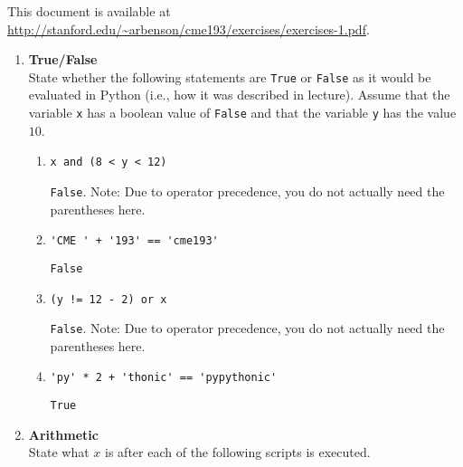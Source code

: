 \documentclass{article}
\begin{document}
\pagestyle{fancy}

This document is available at \url{http://stanford.edu/~arbenson/cme193/exercises/exercises-1.pdf}.


\begin{enumerate}
\item \textbf{True/False} \\
State whether the following statements are \texttt{True} or \texttt{False} as it would be evaluated in Python (i.e., how it was described in lecture).  Assume that the variable \texttt{x} has a boolean value of \texttt{False} and that the variable \texttt{y} has the value $10$.

\begin{enumerate}
\item
\begin{lstlisting}
x and (8 < y < 12)
\end{lstlisting}
\texttt{False}.  Note: Due to operator precedence, you do not actually need the parentheses here.
\end{enumerate}

\begin{enumerate}
\setcounter{enumii}{1}
\item 
\begin{lstlisting}
'CME ' + '193' == 'cme193'
\end{lstlisting}
\texttt{False}
\end{enumerate}

\begin{enumerate}
\setcounter{enumii}{2}
\item 
\begin{lstlisting}
(y != 12 - 2) or x
\end{lstlisting}
\texttt{False}.  Note: Due to operator precedence, you do not actually need the parentheses here.
\end{enumerate}

\begin{enumerate}
\setcounter{enumii}{3}
\item 
\begin{lstlisting}
'py' * 2 + 'thonic' == 'pypythonic'
\end{lstlisting}
\texttt{True}
\end{enumerate}

\item \textbf{Arithmetic} \\
State what $x$ is after each of the following scripts is executed.


\end{enumerate}
\end{document}
